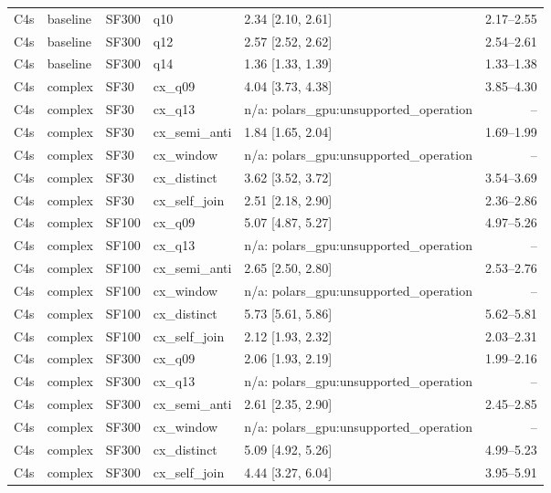 \begin{longtable}{lllllr}
C4s & baseline & SF300 & q10 & 2.34 [2.10, 2.61] & 2.17--2.55 \\
C4s & baseline & SF300 & q12 & 2.57 [2.52, 2.62] & 2.54--2.61 \\
C4s & baseline & SF300 & q14 & 1.36 [1.33, 1.39] & 1.33--1.38 \\
C4s & complex & SF30 & cx\_q09 & 4.04 [3.73, 4.38] & 3.85--4.30 \\
C4s & complex & SF30 & cx\_q13 & n/a: polars\_gpu:unsupported\_operation & -- \\
C4s & complex & SF30 & cx\_semi\_anti & 1.84 [1.65, 2.04] & 1.69--1.99 \\
C4s & complex & SF30 & cx\_window & n/a: polars\_gpu:unsupported\_operation & -- \\
C4s & complex & SF30 & cx\_distinct & 3.62 [3.52, 3.72] & 3.54--3.69 \\
C4s & complex & SF30 & cx\_self\_join & 2.51 [2.18, 2.90] & 2.36--2.86 \\
C4s & complex & SF100 & cx\_q09 & 5.07 [4.87, 5.27] & 4.97--5.26 \\
C4s & complex & SF100 & cx\_q13 & n/a: polars\_gpu:unsupported\_operation & -- \\
C4s & complex & SF100 & cx\_semi\_anti & 2.65 [2.50, 2.80] & 2.53--2.76 \\
C4s & complex & SF100 & cx\_window & n/a: polars\_gpu:unsupported\_operation & -- \\
C4s & complex & SF100 & cx\_distinct & 5.73 [5.61, 5.86] & 5.62--5.81 \\
C4s & complex & SF100 & cx\_self\_join & 2.12 [1.93, 2.32] & 2.03--2.31 \\
C4s & complex & SF300 & cx\_q09 & 2.06 [1.93, 2.19] & 1.99--2.16 \\
C4s & complex & SF300 & cx\_q13 & n/a: polars\_gpu:unsupported\_operation & -- \\
C4s & complex & SF300 & cx\_semi\_anti & 2.61 [2.35, 2.90] & 2.45--2.85 \\
C4s & complex & SF300 & cx\_window & n/a: polars\_gpu:unsupported\_operation & -- \\
C4s & complex & SF300 & cx\_distinct & 5.09 [4.92, 5.26] & 4.99--5.23 \\
C4s & complex & SF300 & cx\_self\_join & 4.44 [3.27, 6.04] & 3.95--5.91 \\
\end{longtable}
